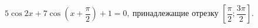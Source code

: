 \begin{ex}[type=equation]
	\begin{condition}
		$\ 5\cos 2x +7\cos{\left(x + \dfrac{\pi}{2}\right)}+ 1 =0,\  $принадлежащие отрезку $\left[\dfrac{\pi}{2};\dfrac{3\pi}{2}\right] .$
	\end{condition}
\end{ex}